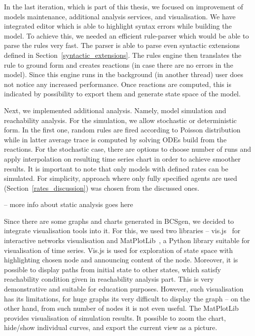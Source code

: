 \documentclass[12pt]{fithesis2}
\begin{document}
In the last iteration, which is part of this thesis, we focused on improvement of models maintenance, additional analysis services, and visualisation. We have integrated editor which is able to highlight syntax errors while building the model. To achieve this, we needed an efficient rule-parser which would be able to parse the rules very fast. The parser is able to parse even syntactic extensions defined in Section~\ref{syntactic_extensions}. The rules engine then translates the rule to ground form and creates reactions (in case there are no errors in the model). Since this engine runs in the background (in another thread) user does not notice any increased performance. Once reactions are computed, this is indicated by possibility to export them and generate state space of the model.

Next, we implemented additional analysis. Namely, model simulation and reachability analysis. For the simulation, we allow stochastic or deterministic form. In the first one, random rules are fired according to Poisson distribution while in latter average trace is computed by solving ODEs build from the reactions. For the stochastic case, there are options to choose number of runs and apply interpolation on resulting time series chart in order to achieve smoother results. It is important to note that only models with defined rates can be simulated. For simplicity, approach where only fully specified agents are used (Section~\ref{rates_discussion}) was chosen from the discussed ones.

 -- more info about static analysis goes here

Since there are some graphs and charts generated in BCSgen, we decided to integrate visualisation tools into it. For this, we used two libraries -- vis.js~\cite{almende2016vis} for interactive networks visualisation and MatPlotLib~\cite{hunter2007matplotlib}, a Python library suitable for visualisation of time series. Vis.js is used for exploration of state space with highlighting chosen node and announcing content of the node. Moreover, it is possible to display paths from initial state to other states, which satisfy reachability condition given in reachability analysis part. This is very demonstrative and suitable for education purposes. However, such visualisation has its limitations, for huge graphs its very difficult to display the graph -- on the other hand, from such number of nodes it is not even useful. The MatPlotLib provides visualisation of simulation results. It possible to zoom the chart, hide/show individual curves, and export the current view as a picture.
\end{document}
